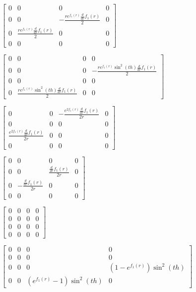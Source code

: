 \documentclass[11pt]{article}
\begin{document}
    
    $\displaystyle \left[\begin{matrix}0 & 0 & 0 & 0\\0 & 0 & - \frac{r e^{f_{1}{\left(r \right)}} \frac{d}{d r} f_{1}{\left(r \right)}}{2} & 0\\0 & \frac{r e^{f_{1}{\left(r \right)}} \frac{d}{d r} f_{1}{\left(r \right)}}{2} & 0 & 0\\0 & 0 & 0 & 0\end{matrix}\right]$

    
    $\displaystyle \left[\begin{matrix}0 & 0 & 0 & 0\\0 & 0 & 0 & - \frac{r e^{f_{1}{\left(r \right)}} \sin^{2}{\left(th \right)} \frac{d}{d r} f_{1}{\left(r \right)}}{2}\\0 & 0 & 0 & 0\\0 & \frac{r e^{f_{1}{\left(r \right)}} \sin^{2}{\left(th \right)} \frac{d}{d r} f_{1}{\left(r \right)}}{2} & 0 & 0\end{matrix}\right]$

    
    $\displaystyle \left[\begin{matrix}0 & 0 & - \frac{e^{2 f_{1}{\left(r \right)}} \frac{d}{d r} f_{1}{\left(r \right)}}{2 r} & 0\\0 & 0 & 0 & 0\\\frac{e^{2 f_{1}{\left(r \right)}} \frac{d}{d r} f_{1}{\left(r \right)}}{2 r} & 0 & 0 & 0\\0 & 0 & 0 & 0\end{matrix}\right]$

    
    $\displaystyle \left[\begin{matrix}0 & 0 & 0 & 0\\0 & 0 & \frac{\frac{d}{d r} f_{1}{\left(r \right)}}{2 r} & 0\\0 & - \frac{\frac{d}{d r} f_{1}{\left(r \right)}}{2 r} & 0 & 0\\0 & 0 & 0 & 0\end{matrix}\right]$

    
    $\displaystyle \left[\begin{matrix}0 & 0 & 0 & 0\\0 & 0 & 0 & 0\\0 & 0 & 0 & 0\\0 & 0 & 0 & 0\end{matrix}\right]$

    
    $\displaystyle \left[\begin{matrix}0 & 0 & 0 & 0\\0 & 0 & 0 & 0\\0 & 0 & 0 & \left(1 - e^{f_{1}{\left(r \right)}}\right) \sin^{2}{\left(th \right)}\\0 & 0 & \left(e^{f_{1}{\left(r \right)}} - 1\right) \sin^{2}{\left(th \right)} & 0\end{matrix}\right]$
\end{document}
